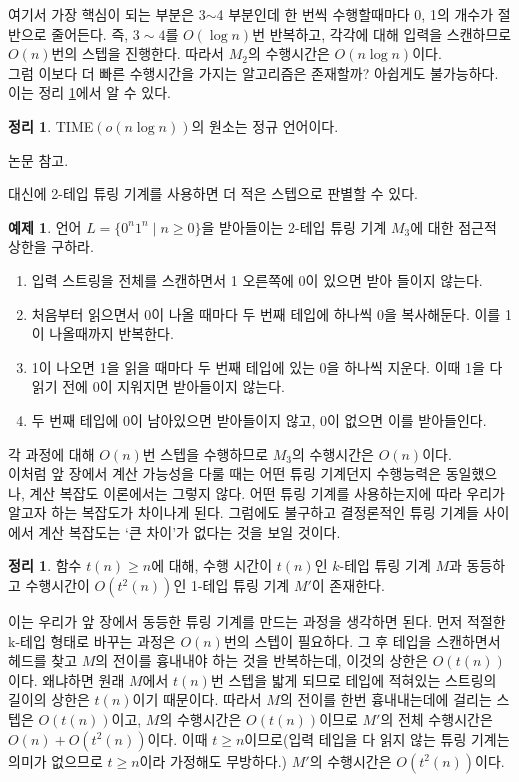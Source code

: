 \documentclass[b5paper, 10pt]{book}
\theoremstyle{definition}
\newtheorem{thm}[defn]{정리}
\newtheorem{ex}[defn]{예제}
\newenvironment{pf*}{\pushQED{\qed}\pf}{\popQED\endpf}
\begin{document}
여기서 가장 핵심이 되는 부분은 3$\sim$4 부분인데 한 번씩 수행할때마다 0, 1의 개수가 절반으로 줄어든다.
즉, $3\sim 4$를 $O(\log{n})$번 반복하고, 각각에 대해 입력을 스캔하므로 $O(n)$번의 스텝을 진행한다. 
따라서 $M_2$의 수행시간은 $O(n\log{n})$이다. \\ 
그럼 이보다 더 빠른 수행시간을 가지는 알고리즘은 존재할까? 아쉽게도 불가능하다. 이는 정리
\ref{regular_nlogn}에서 알 수 있다.
\begin{thm} \label{regular_nlogn}
    TIME$(o(n\log{n}))$의 원소는 정규 언어이다.
\end{thm}
\begin{pf*}
    논문 \cite{kobayashi1985structure} 참고.
\end{pf*}
대신에 2-테입 튜링 기계를 사용하면 더 적은 스텝으로 판별할 수 있다. 
\begin{ex}
    언어 $L= \{0^n1^n \;\vert\; n \ge 0\}$을 받아들이는 2-테입 튜링 기계 $M_3$에
     대한 점근적 상한을 구하라.
    \begin{enumerate}
        \item 입력 스트링을 전체를 스캔하면서 1 오른쪽에 0이 있으면 받아 들이지 않는다. 
        \item 처음부터 읽으면서 0이 나올 때마다 두 번째 테입에 하나씩 0을 복사해둔다.
        이를 1이 나올때까지 반복한다. 
        \item 1이 나오면 1을 읽을 때마다 두 번째 테입에 있는 0을 하나씩 지운다.
        이때 1을 다 읽기 전에 0이 지워지면 받아들이지 않는다.
        \item 두 번째 테입에 0이 남아있으면 받아들이지 않고, 0이 없으면 이를 받아들인다. 
    \end{enumerate}
\end{ex}
각 과정에 대해 $O(n)$번 스텝을 수행하므로 $M_3$의 수행시간은 $O(n)$이다. \\ 
이처럼 앞 장에서 계산 가능성을 다룰 때는 어떤 튜링 기계던지 수행능력은 동일했으나, 계산
복잡도 이론에서는 그렇지 않다. 어떤 튜링 기계를 사용하는지에 따라 우리가 알고자 하는 복잡도가
차이나게 된다. 그럼에도 불구하고 결정론적인 튜링 기계들 사이에서 계산 복잡도는 `큰 차이'가
없다는 것을 보일 것이다. 
\begin{thm} \label{t^2(n)}
    함수 $t(n) \ge n$에 대해, 수행 시간이 $t(n)$인 $k$-테입 튜링 기계 $M$과 동등하고
    수행시간이 $O\left(t^2(n)\right)$인 1-테입 튜링 기계 $M'$이 존재한다. 
\end{thm}
\begin{pf*}
    이는 우리가 앞 장에서 동등한 튜링 기계를 만드는 과정을 
    생각하면 된다. 먼저 적절한 k-테입 형태로 바꾸는 과정은 $O(n)$번의 스텝이 필요하다. 
    그 후 테입을 스캔하면서 헤드를 찾고 $M$의 전이를 흉내내야 하는 것을 반복하는데, 
    이것의 상한은 $O(t(n))$이다.
    왜냐하면 원래 $M$에서 $t(n)$번 스텝을 밟게 되므로 테입에 
    적혀있는 스트링의 길이의 상한은 $t(n)$이기 때문이다. 따라서 $M$의 전이를 한번 흉내내는데에
     걸리는 스텝은 $O(t(n))$이고,
    $M$의 수행시간은 $O(t(n))$이므로 $M'$의 전체 수행시간은 $O(n) + O(t^2(n))$이다. 
    이때 $t \ge n$이므로(입력 테입을
    다 읽지 않는 튜링 기계는 의미가 없으므로 $t\ge n$이라 가정해도 무방하다.) $M'$의 
    수행시간은 $O(t^2(n))$이다.
\end{pf*}
\end{document}
